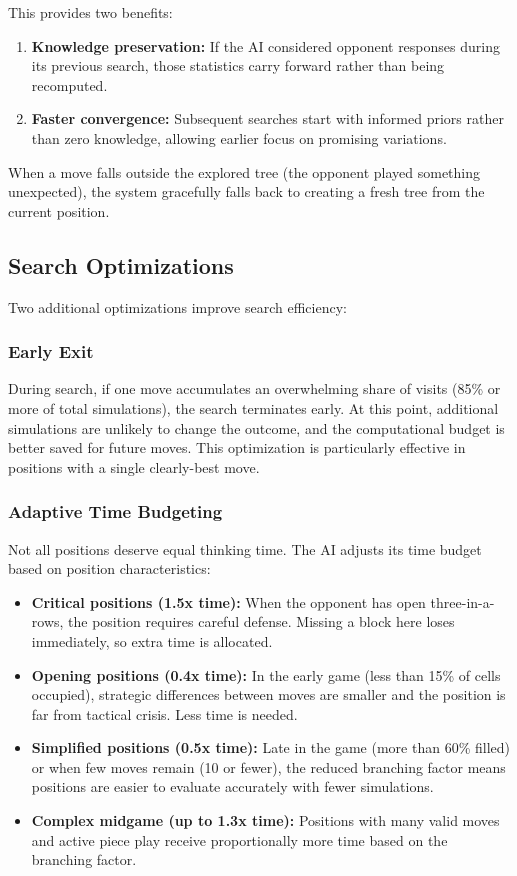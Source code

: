 \documentclass[11pt]{article}
\begin{document}
This provides two benefits:
\begin{enumerate}
    \item \textbf{Knowledge preservation:} If the AI considered opponent responses during its previous search, those statistics carry forward rather than being recomputed.
    \item \textbf{Faster convergence:} Subsequent searches start with informed priors rather than zero knowledge, allowing earlier focus on promising variations.
\end{enumerate}

When a move falls outside the explored tree (the opponent played something unexpected), the system gracefully falls back to creating a fresh tree from the current position.

\subsection{Search Optimizations}

Two additional optimizations improve search efficiency:

\subsubsection{Early Exit}

During search, if one move accumulates an overwhelming share of visits (85\% or more of total simulations), the search terminates early. At this point, additional simulations are unlikely to change the outcome, and the computational budget is better saved for future moves. This optimization is particularly effective in positions with a single clearly-best move.

\subsubsection{Adaptive Time Budgeting}

Not all positions deserve equal thinking time. The AI adjusts its time budget based on position characteristics:

\begin{itemize}
    \item \textbf{Critical positions (1.5x time):} When the opponent has open three-in-a-rows, the position requires careful defense. Missing a block here loses immediately, so extra time is allocated.
    \item \textbf{Opening positions (0.4x time):} In the early game (less than 15\% of cells occupied), strategic differences between moves are smaller and the position is far from tactical crisis. Less time is needed.
    \item \textbf{Simplified positions (0.5x time):} Late in the game (more than 60\% filled) or when few moves remain (10 or fewer), the reduced branching factor means positions are easier to evaluate accurately with fewer simulations.
    \item \textbf{Complex midgame (up to 1.3x time):} Positions with many valid moves and active piece play receive proportionally more time based on the branching factor.
\end{itemize}
\end{document}
